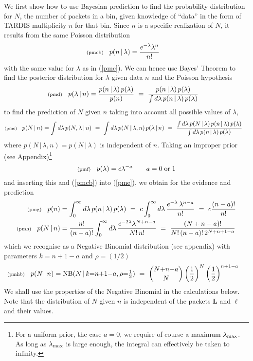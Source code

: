 \documentclass[11pt]{article}
\newcommand{\lleq}[1]{\label{#1} }
\renewcommand{\lleq}[1]{\label{#1} {\scriptstyle {\rm (#1)}} \hspace*{2ex} }
\newcommand{\cond}{\,|\,}
\newcommand{\NBD}{\mathrm{NB}}
\newcommand{\bml}{{\bm{\ell}}}
\newcommand{\bmL}{{\bm{L}}}
\begin{document}
We first show how to use Bayesian prediction to find the probability
distribution for $N$, the number of packets in a bin, given knowledge
of ``data'' in the form of TARDIS multiplicity $n$ for that bin.
Since $n$ is a specific
realization of $N$, it results from the same Poisson distribution
\begin{align}
  \lleq{pmcb}
   p(n\cond\lambda) &= \frac{e^{-\lambda}\lambda^n}{n!}
\end{align}
with the same value for $\lambda$ as in (\ref{pmc}).  We can hence use
Bayes' Theorem to find the posterior distribution for $\lambda$ given
data $n$ and the Poisson hypothesis
\begin{align}
  \lleq{pmd}
  p(\lambda\cond n) %
  &= \frac{p(n\cond\lambda)\,p(\lambda)} {p(n)}
  \ =\ \frac{p(n\cond\lambda)\,p(\lambda)} %
  {\int d\lambda\, p(n\cond\lambda)\,p(\lambda)}
\end{align}
to find the prediction of $N$ given $n$ taking into account all
possible values of $\lambda$,
\begin{align}
  \lleq{pme}
  p(N\cond n)
  &= \int d\lambda\,p(N,\lambda\cond n)
  \ =\ \int d\lambda\,p(N\cond\lambda, n)\,p(\lambda\cond n)
  \ =\ \frac{\int d\lambda\,p(N\cond\lambda)\,p(n\cond\lambda)\,p(\lambda)}
  {\int d\lambda\, p(n\cond\lambda)\,p(\lambda)}
\end{align}
where $p(N\cond\lambda,n) = p(N\cond\lambda)$ is independent of $n$.
Taking an improper prior (see Appendix)\footnote{For a uniform prior,
  the case $a{=}0$, we require of course a maximum $\lambda_{\rm
    max}$. As long as $\lambda_{\rm max}$ is large enough, the
  integral can effectively be taken to infinity.}
\begin{align}
  \lleq{pmf}
  p(\lambda) = c\lambda^{-a} \qquad a = 0\;\text{or}\;1
\end{align}
and inserting this and (\ref{pmcb}) into (\ref{pme}), we obtain
for the evidence and prediction
\begin{align}
  \lleq{pmg}
  p(n) &= %
  \int_0^\infty d\lambda\, p(n\cond\lambda)\,p(\lambda)
  \ =\
  c \int_0^\infty d\lambda\, \frac{e^{-\lambda}\,\lambda^{n-a}}{n!}
  \ =\ c\frac{(n-a)!}{n!}
  \\
  \lleq{pmh}
  p(N\cond n) %
  &= \frac{n!}{(n-a)!} \int_0^\infty d\lambda\,
  \frac{e^{-2\lambda} \lambda^{N+n-a}}{N!\, n!}
  \ =\ \frac{(N+n-a)!}{N!\,(n-a)!\,2^{N+n+1-a}}
\end{align}
which we recognise as a Negative Binomial distribution (see appendix)
with parameters $k=n+1-a$ and $\rho=(1/2)$
\begin{align}
  \lleq{pmhb}
  p(N\cond n) &= \NBD(N\cond k{=}n{+}1{-}a, \rho{=}\tfrac{1}{2})
  \ =\ \binom{N{+}n{-}a}{N}
  \left(\frac{1}{2}\right)^N \left(\frac{1}{2}\right)^{n+1-a}
\end{align}
We shall use the properties of the Negative Binomial in the
calculations below.  Note that the distribution of $N$ given $n$ is
independent of the packets $\bmL$ and $\bml$ and their values.
\end{document}
